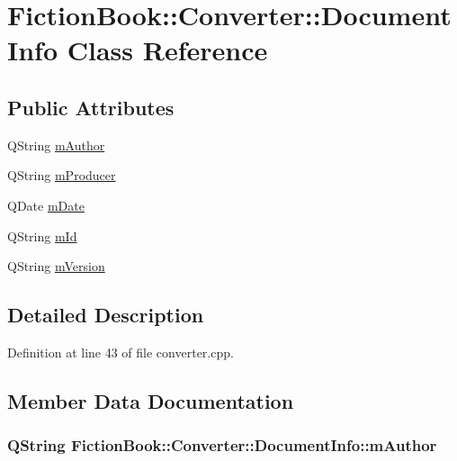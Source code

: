 \hypertarget{classConverter_1_1DocumentInfo}{\section{Fiction\+Book\+:\+:Converter\+:\+:Document\+Info Class Reference}
\label{classConverter_1_1DocumentInfo}
}
\subsection*{Public Attributes}
\begin{DoxyCompactItemize}
\item 
Q\+String \hyperlink{classConverter_1_1DocumentInfo_a5cfa7524bcad228779e8fd70934170c0}{m\+Author}
\item 
Q\+String \hyperlink{classConverter_1_1DocumentInfo_a37486c959f5eb91b039b54092aa4eb33}{m\+Producer}
\item 
Q\+Date \hyperlink{classConverter_1_1DocumentInfo_a5a6937c62c571c7c757aa753012a24ca}{m\+Date}
\item 
Q\+String \hyperlink{classConverter_1_1DocumentInfo_a38f83204dec0ae6800d51ebdaafcb030}{m\+Id}
\item 
Q\+String \hyperlink{classConverter_1_1DocumentInfo_ac06f33613cdbcec3be7fe4d70c8a9e51}{m\+Version}
\end{DoxyCompactItemize}


\subsection{Detailed Description}


Definition at line 43 of file converter.\+cpp.



\subsection{Member Data Documentation}
\hypertarget{classConverter_1_1DocumentInfo_a5cfa7524bcad228779e8fd70934170c0}{
\subsubsection[{m\+Author}]{\setlength{\rightskip}{0pt plus 5cm}Q\+String Fiction\+Book\+::\+Converter\+::\+Document\+Info\+::m\+Author}}\label{classConverter_1_1DocumentInfo_a5cfa7524bcad228779e8fd70934170c0}


